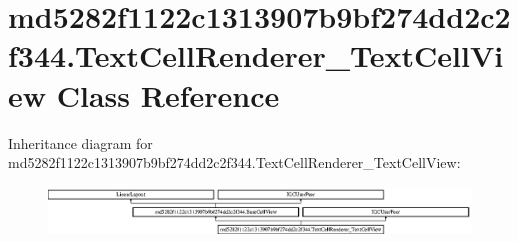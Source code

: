\hypertarget{classmd5282f1122c1313907b9bf274dd2c2f344_1_1TextCellRenderer__TextCellView}{}\section{md5282f1122c1313907b9bf274dd2c2f344.\+Text\+Cell\+Renderer\+\_\+\+Text\+Cell\+View Class Reference}
\label{classmd5282f1122c1313907b9bf274dd2c2f344_1_1TextCellRenderer__TextCellView}
Inheritance diagram for md5282f1122c1313907b9bf274dd2c2f344.\+Text\+Cell\+Renderer\+\_\+\+Text\+Cell\+View\+:\begin{figure}[H]
\begin{center}
\leavevmode
\includegraphics[height=1.272727cm]{classmd5282f1122c1313907b9bf274dd2c2f344_1_1TextCellRenderer__TextCellView}
\end{center}
\end{figure}
